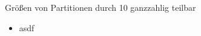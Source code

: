 \begin{frame}[fragile]{Größen von Partitionen durch 10 ganzzahlig teilbar}
  \begin{itemize}
    \item asdf
  \end{itemize}
\end{frame}

